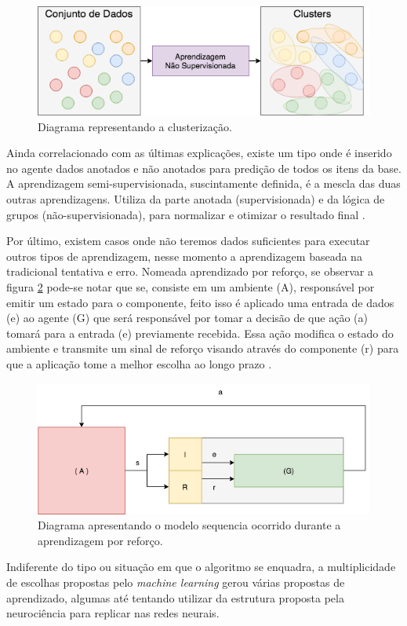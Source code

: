 \begin{figure}
    \centering
    \includegraphics[width=.8\textwidth]{imagens/unsupervised.png}
    \caption{Diagrama representando a clusterização.}
    \label{fig:unsupervised}
\end{figure}

Ainda correlacionado com as últimas explicações, existe um tipo onde é inserido no agente dados anotados e não anotados para predição de todos os itens da base. A aprendizagem semi-supervisionada, suscintamente definida, é a mescla das duas outras aprendizagens. Utiliza da parte anotada (supervisionada) e da lógica de grupos (não-supervisionada), para normalizar e otimizar o resultado final \cite[7]{mohri2012foundations}.

Por último, existem casos onde não teremos dados suficientes para executar outros tipos de aprendizagem, nesse momento a aprendizagem baseada na tradicional tentativa e erro. Nomeada aprendizado por reforço, se observar a figura \ref{fig:reinforcement} pode-se notar que se, consiste em um ambiente (A), responsável por emitir um estado para o componente, feito isso é aplicado uma entrada de dados (e) ao agente (G) que será responsável por tomar a decisão de que ação (a) tomará para a entrada (e) previamente recebida. Essa ação modifica o estado do ambiente e transmite um sinal de reforço visando através do componente (r) para que a aplicação tome a melhor escolha ao longo prazo \cite{kaelbling1996reinforcement, russell2003artificial}.

\begin{figure}
    \centering
    \includegraphics[width=.8\textwidth]{imagens/reinforcement.png}
    \caption{Diagrama apresentando o modelo sequencia ocorrido durante a aprendizagem por reforço.}
    \label{fig:reinforcement}
\end{figure}

Indiferente do tipo ou situação em que o algoritmo se enquadra, a multiplicidade de escolhas propostas pelo \textit{machine learning} gerou várias propostas de aprendizado, algumas até tentando utilizar da estrutura proposta pela neurociência para replicar nas redes neurais.
